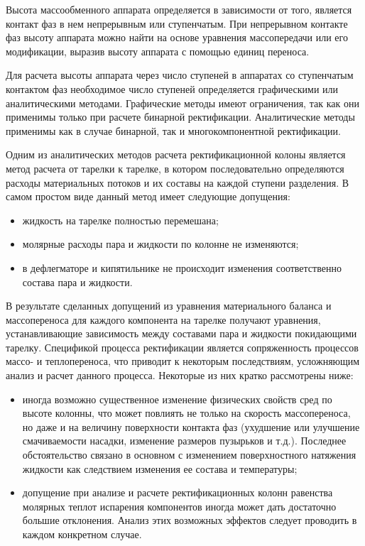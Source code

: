 Высота массообменного аппарата определяется в зависимости от того, является контакт фаз в нем непрерывным или ступенчатым. При непрерывном контакте фаз высоту аппарата можно найти на основе уравнения массопередачи или его модификации, выразив высоту аппарата с помощью единиц переноса.

Для расчета высоты аппарата через число ступеней в аппаратах со ступенчатым контактом фаз необходимое число ступеней определяется графическими или аналитическими методами. Графические методы имеют ограничения, так как они применимы только при расчете бинарной ректификации. Аналитические методы применимы как в случае бинарной, так и многокомпонентной ректификации.

Одним из аналитических методов расчета ректификационной колоны является метод расчета от тарелки к тарелке, в котором последовательно определяются расходы материальных потоков и их составы на каждой ступени разделения. В самом простом виде данный метод имеет следующие допущения:
\begin{itemize}
	\item жидкость на тарелке полностью перемешана;
	\item молярные расходы пара и жидкости по колонне не изменяются;
	\item в дефлегматоре и кипятильнике не происходит изменения соответственно состава пара и жидкости.
\end{itemize}

В результате сделанных допущений из уравнения материального баланса и массопереноса для каждого компонента на тарелке получают уравнения, устанавливающие зависимость между составами пара и жидкости покидающими тарелку. 
Спецификой процесса ректификации является сопряженность процессов массо- и теплопереноса, что приводит к некоторым последствиям, усложняющим анализ и расчет данного процесса. Некоторые из них кратко рассмотрены ниже:
\begin{itemize}
	\item иногда возможно существенное изменение физических свойств сред по высоте колонны, что может повлиять не только на скорость массопереноса, но даже и на величину поверхности контакта фаз (ухудшение или улучшение смачиваемости насадки, изменение размеров пузырьков и т.д.). Последнее обстоятельство связано в основном с изменением поверхностного натяжения жидкости как следствием изменения ее состава и температуры;
	\item допущение при анализе и расчете ректификационных колонн равенства молярных теплот испарения компонентов иногда может дать достаточно большие отклонения. Анализ этих возможных эффектов следует проводить в каждом конкретном случае.
\end{itemize}

